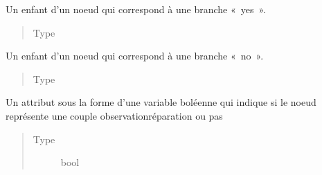 \documentclass[letterpaper,10pt,french]{sphinxmanual}
\begin{document}
\begin{fulllineitems}
\begin{fulllineitems}
\begin{quote}
\begin{description}
\end{description}\end{quote}

\end{fulllineitems}


\begin{fulllineitems}
\label{\detokenize{index:StrategyTree.Observation._yes_child}}
Un enfant d’un noeud qui correspond à une branche « yes ».
\begin{quote}\begin{description}
\item[{Type}] \leavevmode
{\hyperref[\detokenize{index:StrategyTree.NodeST}]{}}

\end{description}\end{quote}

\end{fulllineitems}


\begin{fulllineitems}
\label{\detokenize{index:StrategyTree.Observation._no_child}}
Un enfant d’un noeud qui correspond à une branche « no ».
\begin{quote}\begin{description}
\item[{Type}] \leavevmode
{\hyperref[\detokenize{index:StrategyTree.NodeST}]{}}

\end{description}\end{quote}

\end{fulllineitems}


\begin{fulllineitems}
\label{\detokenize{index:StrategyTree.Observation._obs_rep_couples}}
Un attribut sous la forme d’une variable boléenne qui indique si le noeud représente une couple
observation\sphinxhyphen{}réparation ou pas
\begin{quote}\begin{description}
\item[{Type}] \leavevmode
bool


\end{description}
\end{quote}
\end{fulllineitems}
\end{fulllineitems}
\end{document}

